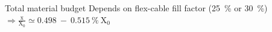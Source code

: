 \documentclass{beamer}
\begin{document}
\begin{frame}
\begin{columns}[c]
\begin{column}{5cm}
      \end{column}
    \end{columns}

    \begin{block}{Total material budget}
      \centering 
      Depends on flex-cable fill factor (25~\% or 30~\%)
      $\Rightarrow \frac{\text{x}}{\text{X}_0} \simeq 0.498~-~0.515~\%~\text{X}_0$
      \\
    \end{block}
  \end{frame}
\end{document}
